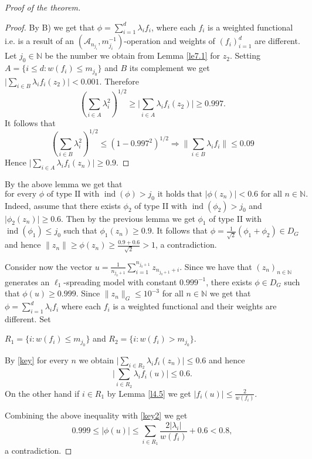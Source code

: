 \documentclass[a4paper]{amsart}
\theoremstyle{plain}
\newcommand{\N}{\mathbb{N}}
\newcommand{\mc}{\mathcal}
\newcommand{\norm}[1][\cdot]{\lVert #1\rVert}
\newcommand{\xn}[1][x]{(#1_{n})_{n\in\N}}
\DeclareMathOperator{\inde}{ind}
\begin{document}
\begin{proof}[Proof of the theorem]
\begin{proof}
By B) we get that $\phi=\sum_{i=1}^{d}\lambda_{i}f_{i}$, where each $f_{i}$ is a
weighted functional i.e. is a result of an $(\mc{A}_{n_{j_i}}, m_{j_i}^{-1})$-operation
and weights of $(f_i)_{i=1}^d$ are different.
Let
$j_0\in\N$ be the  number we obtain from Lemma \ref{le7.1} for $z_{2}$. Setting
$A=\{i\leq d: w(f_{i})\leq m_{j_0}\}$ and $B$ its complement we get $\vert\sum_{i\in
B}\lambda_{i}f_{i}(z_2)\vert<0.001$. Therefore
$$
(\sum_{i\in A}\lambda_{i}^2)^{1/2}\geq
\vert\sum_{i\in A}\lambda_{i}f_{i}(z_{2})\vert\geq 0.997.
$$
It follows that
$$(\sum_{i\in B}\lambda_{i}^{2})^{1/2}\leq (1-0.997^2)^{1/2}\Rightarrow\|\sum_{i\in B}\lambda_{i}f_{i}\|\leq 0.09
$$
Hence $\vert \sum_{i\in A}\lambda_{i}f_{i}(z_{n})\vert\geq 0.9$.
\end{proof}
By the above lemma we get that
\begin{equation}\label{key}\mbox{for every $\phi$ of type II with $\inde(\phi)> j_0$ it holds that $\vert \phi(z_n)\vert<0.6$ for all $n\in\N$.}
\end{equation}
Indeed, assume that there exists $\phi_{2}$ of type II with $\inde(\phi_{2})>j_0$ and
$\vert\phi_{2}(z_{n})\vert\geq 0.6$. Then by the previous lemma we get $\phi_{1}$ of type
II with $\inde(\phi_{1})\leq j_0$ such that $\phi_1(z_{n})\geq 0.9$. It follows that
$\phi=\frac{1}{\sqrt{2}}(\phi_{1}+\phi_{2})\in D_{G}$ and hence
$\norm[z_{n}]\geq\phi(z_n)\geq \frac{0.9+0.6}{\sqrt{2}}>1$, a contradiction.


Consider now the vector
$u=\frac{1}{n_{j_0+1}}\sum_{i=1}^{n_{j_0+1}}z_{n_{j_0+1}+i}$.
Since we have  that $\xn[z]$ generates an $\ell_{1}$-spreading model with constant $0.999^{-1}$,
there exists  $\phi\in  D_{G}$
such  that $\phi(u)\geq 0.999$.
Since  $\norm[z_n]_{G}\leq 10^{-3}$ for all $n\in\N$  we
get
that $\phi=\sum_{i=1}^{d}\lambda_{i}f_{i}$ where each $f_{i}$ is a weighted functional and their weights are different.
Set
\begin{center}
$R_{1}=\{i: w(f_{i})\leq m_{j_0}\}$ and  $R_{2}=\{i: w(f_{i})>m_{j_0}\}.$
 \end{center}
 By
\eqref{key}  for every $n$ we obtain $\vert\sum_{i\in
R_{2}}\lambda_{i}f_{i}(z_n)\vert\leq 0.6$ and hence
\begin{equation}\label{key2}
\vert\sum_{i\in R_{2}}\lambda_{i}f_{i}(u)\vert\leq 0.6.
\end{equation}
On the other hand if $i\in R_{1}$    by Lemma \ref{l4.5} we get
$
\vert f_{i}(u)\vert\leq\frac{2}{w(f_{i})}.
$


Combining the above inequality with  \eqref{key2} we get
$$
0.999 \leq \vert\phi(u)\vert\leq \sum_{i\in
R_{1}}\frac{2\vert\lambda_{i}\vert}{w(f_{i})}+0.6<0.8,
$$
a contradiction.
\end{proof}
\end{document}
